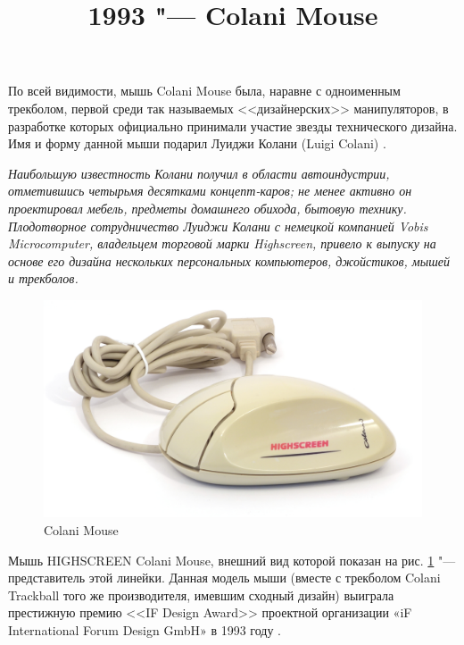\documentclass[11pt, a4paper]{article}
\begin{document}
\title{1993 "--- Colani Mouse}
\date{}
\maketitle
{}
По всей видимости, мышь Colani Mouse была, наравне с одноименным трекболом, первой среди так называемых <<дизайнерских>> манипуляторов, в разработке которых официально принимали участие звезды технического дизайна. Имя и форму данной мыши подарил Луиджи Колани (Luigi Colani) \cite{wiki}.

\textit{Наибольшую известность Колани получил в области автоиндустрии, отметившись четырьмя десятками концепт-каров; не менее активно он проектировал мебель, предметы домашнего обихода, бытовую технику. Плодотворное сотрудничество Луиджи Колани с немецкой компанией Vobis Microcomputer, владельцем торговой марки Highscreen, привело к выпуску на основе его дизайна нескольких персональных компьютеров, джойстиков, мышей и трекболов.}

\begin{figure}[h]
    \centering
    \includegraphics[scale=0.6]{1993_colani_mouse/pic_60.jpg}
    \caption{Colani Mouse}
    \label{fig:ColaniMousePic}
\end{figure}

Мышь HIGHSCREEN Colani Mouse, внешний вид которой показан на рис. \ref{fig:ColaniMousePic} "--- представитель этой линейки. Данная модель мыши (вместе с трекболом Colani Trackball того же производителя, имевшим сходный дизайн) выиграла престижную премию <<IF Design Award>> проектной организации «iF International Forum Design GmbH» в 1993 году \cite{award}.
\end{document}
